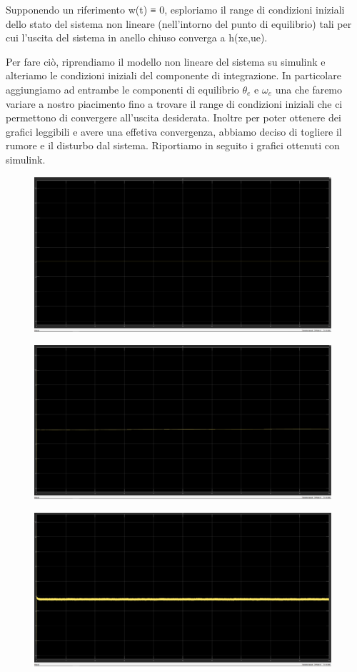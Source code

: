 \documentclass[a4paper, 11pt]{article}
\begin{document}
Supponendo un riferimento w(t) ≡ 0, esploriamo il range di condizioni iniziali dello stato del sistema non lineare (nell’intorno del punto di equilibrio) tali per cui l’uscita del sistema in anello chiuso converga a h(xe,ue).

Per fare ciò, riprendiamo il modello non lineare del sistema su simulink e alteriamo le condizioni iniziali del componente di integrazione. In particolare aggiungiamo ad entrambe le componenti di equilibrio $\theta_e$ e $\omega_e$ una \delta che faremo variare a nostro piacimento fino a trovare il range di condizioni iniziali che ci permettono di convergere all'uscita desiderata.
Inoltre per poter ottenere dei grafici leggibili e avere una effetiva convergenza, abbiamo deciso di togliere il rumore e il disturbo dal sistema.
Riportiamo in seguito i grafici ottenuti con simulink.

\begin{figure}[H]
    \centering
\includegraphics[width=110mm]{figs/delta0.PNG}
    \caption{}
    \label{Figura11: delta = 0}
\end{figure}

\begin{figure}[H]
    \centering
\includegraphics[width=110mm]{figs/delta8.PNG}
    \caption{}
    \label{Figura10: delta = 8}
\end{figure}

\begin{figure}[H]
    \centering
\includegraphics[width=110mm]{figs/delta9.PNG}
    \caption{}
    \label{Figura10: delta = 9}
\end{figure}
\end{document}
